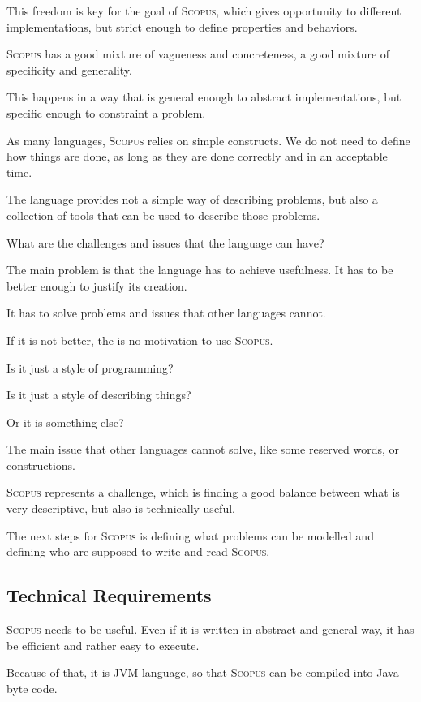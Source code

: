 \documentclass[12pt,a4paper]{article}
\newcommand{\Scopus}{\textsc{Scopus}\xspace}
\begin{document}
    This freedom is key for the goal of \Scopus, which gives opportunity to different implementations, but strict enough to define properties and behaviors.

    \Scopus has a good mixture of vagueness and concreteness, a good mixture of specificity and generality.

    This happens in a way that is general enough to abstract implementations, but specific enough to constraint a problem.

    As many languages, \Scopus relies on simple constructs.
    We do not need to define how things are done, as long as they are done correctly and in an acceptable time.

    The language provides not a simple way of describing problems, but also a collection of tools that can be used to describe those problems.

    What are the challenges and issues that the language can have?

    The main problem is that the language has to achieve usefulness.
    It has to be better enough to justify its creation.

    It has to solve problems and issues that other languages cannot.

    If it is not better, the is no motivation to use \Scopus.

    Is it just a style of programming?

    Is it just a style of describing things?

    Or it is something else?

    The main issue that other languages cannot solve, like some reserved words, or constructions.

    \Scopus represents a challenge, which is finding a good balance between what is very descriptive, but also is technically useful.

    The next steps for \Scopus is defining what problems can be modelled and defining who are supposed to write and read \Scopus.

    \subsection{Technical Requirements}

    \Scopus needs to be useful.
    Even if it is written in abstract and general way, it has be efficient and rather easy to execute.

    Because of that, it is JVM language, so that \Scopus can be compiled into Java byte code.
\end{document}
